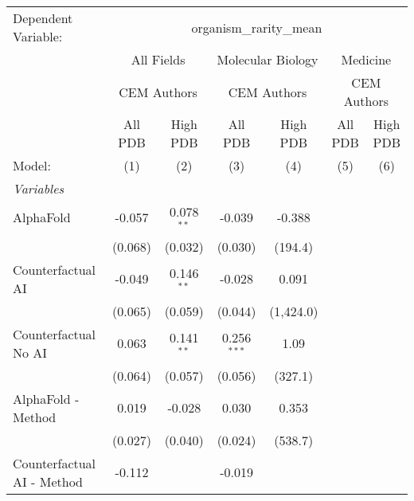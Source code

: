 \begingroup
\centering
\begin{tabular}{lcccccc}
   \tabularnewline \midrule \midrule
   Dependent Variable: & \multicolumn{6}{c}{organism\_rarity\_mean}\\
 & \multicolumn{2}{c}{All Fields} & \multicolumn{2}{c}{Molecular Biology} & \multicolumn{2}{c}{Medicine} \\
\cmidrule(lr){2-3} \cmidrule(lr){4-5} \cmidrule(lr){6-7}
 & \multicolumn{2}{c}{CEM Authors} & \multicolumn{2}{c}{CEM Authors} & \multicolumn{2}{c}{CEM Authors} \\
\cmidrule(lr){2-3} \cmidrule(lr){4-5} \cmidrule(lr){6-7}
 & \multicolumn{1}{c}{All PDB} & \multicolumn{1}{c}{High PDB} & \multicolumn{1}{c}{All PDB} & \multicolumn{1}{c}{High PDB} & \multicolumn{1}{c}{All PDB} & \multicolumn{1}{c}{High PDB} \\
\cmidrule(lr){2-2} \cmidrule(lr){3-3} \cmidrule(lr){4-4} \cmidrule(lr){5-5} \cmidrule(lr){6-6} \cmidrule(lr){7-7}
   Model:                                                     & (1)     & (2)          & (3)           & (4)       & (5) & (6)\\  
   \midrule
   \emph{Variables}\\
   AlphaFold                                                  & -0.057  & 0.078$^{**}$ & -0.039        & -0.388    &     &   \\   
                                                              & (0.068) & (0.032)      & (0.030)       & (194.4)   &     &   \\   
   Counterfactual AI                                          & -0.049  & 0.146$^{**}$ & -0.028        & 0.091     &     &   \\   
                                                              & (0.065) & (0.059)      & (0.044)       & (1,424.0) &     &   \\   
   Counterfactual No AI                                       & 0.063   & 0.141$^{**}$ & 0.256$^{***}$ & 1.09      &     &   \\   
                                                              & (0.064) & (0.057)      & (0.056)       & (327.1)   &     &   \\   
   AlphaFold - Method                                         & 0.019   & -0.028       & 0.030         & 0.353     &     &   \\   
                                                              & (0.027) & (0.040)      & (0.024)       & (538.7)   &     &   \\   
   Counterfactual AI - Method                                 & -0.112  &              & -0.019        &           &     &   \\   

\end{tabular}
